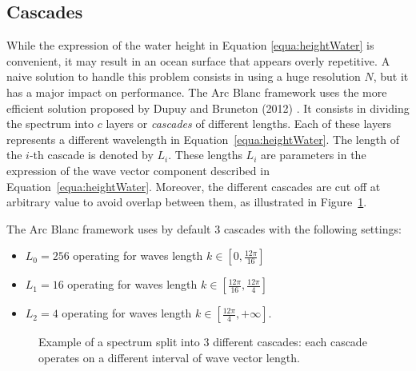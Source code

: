 \documentclass[11pt]{article}
\def\Framework{The Arc Blanc framework\xspace}
\begin{document}
\subsection{Cascades}
\label{subsec:cascades}
While the expression of the water height in Equation \ref{equa:heightWater} is convenient, it may result in an ocean surface that appears overly repetitive.
A naive solution to handle this problem consists in using a huge resolution $N$, but it has a major impact on performance.
\Framework uses the more efficient solution proposed by Dupuy and Bruneton (2012) \cite{dupuyRealtimeAnimationRendering2012}.
It consists in dividing the spectrum into $c$ layers or \emph{cascades} of different lengths.
Each of these layers represents a different wavelength in Equation~\ref{equa:heightWater}.
The length of the $i$-th cascade is denoted by $L_i$.
These lengths $L_i$ are parameters in the expression of the wave vector component described in Equation~\ref{equa:heightWater}.
Moreover, the different cascades are cut off at arbitrary value to avoid overlap between them, as illustrated in Figure~\ref{fig:cascades}.

\Framework uses by default $3$ cascades with the following settings:
\begin{itemize}
	\item $L_0 = 256$ operating for waves length $k\in [0,\frac{12\pi}{16}]$
	\item $L_1 = 16$ operating for waves length $k\in [\frac{12\pi}{16},\frac{12\pi}{4}]$
	\item $L_2 = 4$ operating for waves length $k\in [\frac{12\pi}{4},+\infty]$.
\end{itemize}


\begin{figure}
	\centering
	
	\caption{Example of a spectrum split into $3$ different cascades: each cascade operates on a different interval of wave vector length.}
	\label{fig:cascades}
\end{figure}


\end{document}
